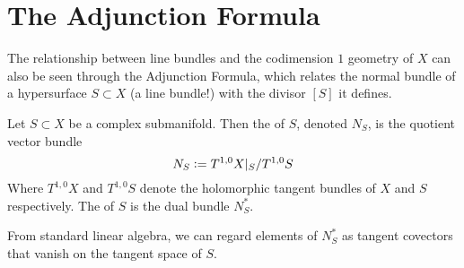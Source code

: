%
\section{The Adjunction Formula}
%
The relationship between line bundles and the codimension $1$ geometry of $X$ can also
be seen through the Adjunction Formula, which relates the normal bundle of a
hypersurface $S \subset X$ (a line bundle!) with the divisor $[S]$ it defines.
%
\begin{defn}
Let $S \subset X$ be a complex submanifold. Then the  of $S$, denoted
$N_S$, is the quotient vector bundle
\[
N_S \vcentcolon= T^{1,0}X\vert_S/T^{1,0}S
\]
Where $T^{1,0}X$ and $T^{1,0}S$ denote the holomorphic tangent bundles of $X$
and $S$ respectively. The  of $S$ is the dual bundle $N_S^*$.
\end{defn}
%
From standard linear algebra, we can regard elements of $N_S^*$ as tangent covectors
that vanish on the tangent space of $S$. \\

